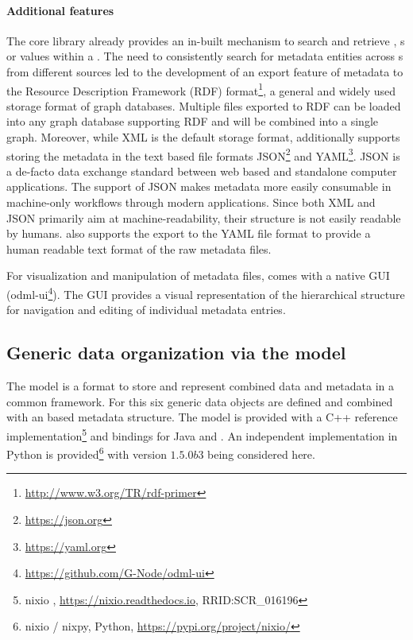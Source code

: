 \paragraph{Additional features}
The  core library already provides an in-built mechanism to search and retrieve , s or values within a . The need to consistently search for metadata entities across s from different sources led to the development of an export feature of  metadata to the Resource Description Framework (RDF) format\footnote{\url{http://www.w3.org/TR/rdf-primer}}, a general and widely used storage format of graph databases. Multiple  files exported to RDF can be loaded into any graph database supporting RDF and will be combined into a single graph. Moreover, while XML is the default storage format,  additionally supports storing the metadata in the text based file formats JSON\footnote{\url{https://json.org}} and YAML\footnote{\url{https://yaml.org}}. JSON is a de-facto data exchange standard between web based and standalone computer applications. The support of JSON makes  metadata more easily consumable in machine-only workflows through modern applications. Since both XML and JSON primarily aim at machine-readability, their structure is not easily readable by humans.  also supports the export to the YAML file format to provide a human readable text format of the raw metadata files.

For visualization and manipulation of metadata files,  comes with a native  GUI (odml-ui\footnote{\url{https://github.com/G-Node/odml-ui}}). The GUI provides a visual representation of the hierarchical structure for navigation and editing of individual metadata entries.


\subsection{Generic data organization via the  model}
The  model is a format to store and represent combined data and metadata in a common framework. For this six generic data objects are defined and combined with an  based metadata structure. The  model is provided with a C++ reference implementation\footnote{nixio , \url{https://nixio.readthedocs.io},  RRID:SCR\_016196} and bindings for Java and . An independent implementation in Python is provided\footnote{nixio / nixpy, Python, \url{https://pypi.org/project/nixio/}} with version $1.5.0b3$ being considered here.

